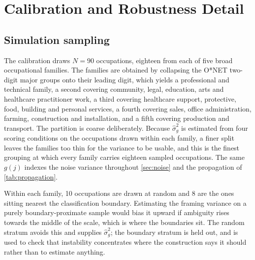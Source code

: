 \section{Calibration and Robustness Detail}\label{app:calibration}

\subsection{Simulation sampling}

The calibration draws $N = 90$ occupations, eighteen from each of five broad occupational families. The families are obtained by collapsing the O*NET two-digit major groups onto their leading digit, which yields a professional and technical family, a second covering community, legal, education, arts and healthcare practitioner work, a third covering healthcare support, protective, food, building and personal services, a fourth covering sales, office administration, farming, construction and installation, and a fifth covering production and transport. The partition is coarse deliberately. Because $\widehat{\sigma}^2_g$ is estimated from four scoring conditions on the occupations drawn within each family, a finer split leaves the families too thin for the variance to be usable, and this is the finest grouping at which every family carries eighteen sampled occupations. The same $g(j)$ indexes the noise variance throughout \cref{sec:noise} and the propagation of \cref{tab:propagation}.

Within each family, 10 occupations are drawn at random and 8 are the ones sitting nearest the classification boundary. Estimating the framing variance on a purely boundary-proximate sample would bias it upward if ambiguity rises towards the middle of the scale, which is where the boundaries sit. The random stratum avoids this and supplies $\widehat{\sigma}^2_g$; the boundary stratum is held out, and is used to check that instability concentrates where the construction says it should rather than to estimate anything.




